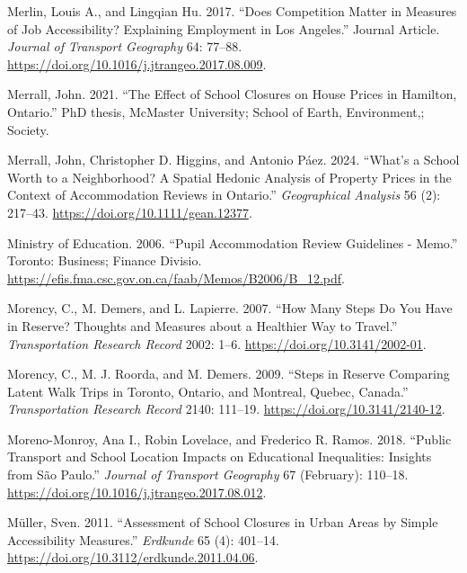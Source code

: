 \documentclass[
default
]{sn-jnl}
\newlength{\cslhangindent}
\newenvironment{CSLReferences}[2] %
 {\begin{list}{}{%
  \setlength{\itemindent}{0pt}
  \setlength{\leftmargin}{0pt}
  \setlength{\parsep}{0pt}
  \ifodd #1
   \setlength{\leftmargin}{\cslhangindent}
   \setlength{\itemindent}{-1\cslhangindent}
  \fi
  \setlength{\itemsep}{#2\baselineskip}}}
 {\end{list}}
\begin{document}
\begin{CSLReferences}{1}{0}
Merlin, Louis A., and Lingqian Hu. 2017. {``Does Competition Matter in
Measures of Job Accessibility? Explaining Employment in Los Angeles.''}
Journal Article. \emph{Journal of Transport Geography} 64: 77--88.
\url{https://doi.org/10.1016/j.jtrangeo.2017.08.009}.

Merrall, John. 2021. {``The Effect of School Closures on House Prices in
Hamilton, Ontario.''} PhD thesis, McMaster University; School of Earth,
Environment,; Society.

Merrall, John, Christopher D. Higgins, and Antonio Páez. 2024. {``What's
a School Worth to a Neighborhood? {A} Spatial Hedonic Analysis of
Property Prices in the Context of Accommodation Reviews in Ontario.''}
\emph{Geographical Analysis} 56 (2): 217--43.
\url{https://doi.org/10.1111/gean.12377}.

Ministry of Education. 2006. {``Pupil Accommodation Review Guidelines -
Memo.''} Toronto: Business; Finance Divisio.
\url{https://efis.fma.csc.gov.on.ca/faab/Memos/B2006/B_12.pdf}.

Morency, C., M. Demers, and L. Lapierre. 2007. {``How Many Steps Do You
Have in Reserve? {Thoughts} and Measures about a Healthier Way to
Travel.''} \emph{Transportation Research Record} 2002: 1--6.
\url{https://doi.org/10.3141/2002-01}.

Morency, C., M. J. Roorda, and M. Demers. 2009. {``Steps in {Reserve
Comparing Latent Walk Trips} in {Toronto}, {Ontario}, and {Montreal},
{Quebec}, {Canada}.''} \emph{Transportation Research Record} 2140:
111--19. \url{https://doi.org/10.3141/2140-12}.

Moreno-Monroy, Ana I., Robin Lovelace, and Frederico R. Ramos. 2018.
{``Public Transport and School Location Impacts on Educational
Inequalities: Insights from São Paulo.''} \emph{Journal of Transport
Geography} 67 (February): 110--18.
\url{https://doi.org/10.1016/j.jtrangeo.2017.08.012}.

Müller, Sven. 2011. {``Assessment of School Closures in Urban Areas by
Simple Accessibility Measures.''} \emph{Erdkunde} 65 (4): 401--14.
\url{https://doi.org/10.3112/erdkunde.2011.04.06}.


\end{CSLReferences}
\end{document}
